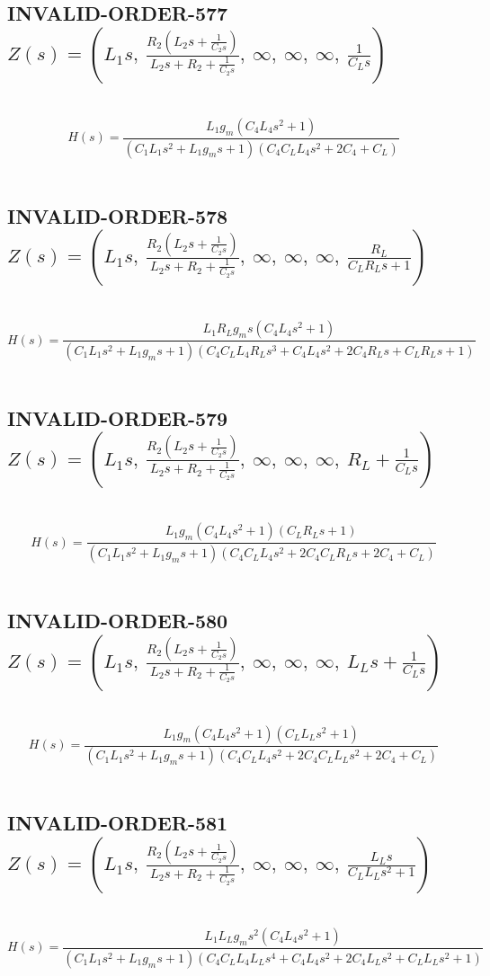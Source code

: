 \documentclass{article}
\begin{document}
\subsection{INVALID-ORDER-577 $Z(s) = \left( L_{1} s, \  \frac{R_{2} \left(L_{2} s + \frac{1}{C_{2} s}\right)}{L_{2} s + R_{2} + \frac{1}{C_{2} s}}, \  \infty, \  \infty, \  \infty, \  \frac{1}{C_{L} s}\right)$ } \ 
\textbf{\[H(s) = \frac{L_{1} g_{m} \left(C_{4} L_{4} s^{2} + 1\right)}{\left(C_{1} L_{1} s^{2} + L_{1} g_{m} s + 1\right) \left(C_{4} C_{L} L_{4} s^{2} + 2 C_{4} + C_{L}\right)}\] } \ 
\subsection{INVALID-ORDER-578 $Z(s) = \left( L_{1} s, \  \frac{R_{2} \left(L_{2} s + \frac{1}{C_{2} s}\right)}{L_{2} s + R_{2} + \frac{1}{C_{2} s}}, \  \infty, \  \infty, \  \infty, \  \frac{R_{L}}{C_{L} R_{L} s + 1}\right)$ } \ 
\textbf{\[H(s) = \frac{L_{1} R_{L} g_{m} s \left(C_{4} L_{4} s^{2} + 1\right)}{\left(C_{1} L_{1} s^{2} + L_{1} g_{m} s + 1\right) \left(C_{4} C_{L} L_{4} R_{L} s^{3} + C_{4} L_{4} s^{2} + 2 C_{4} R_{L} s + C_{L} R_{L} s + 1\right)}\] } \ 
\subsection{INVALID-ORDER-579 $Z(s) = \left( L_{1} s, \  \frac{R_{2} \left(L_{2} s + \frac{1}{C_{2} s}\right)}{L_{2} s + R_{2} + \frac{1}{C_{2} s}}, \  \infty, \  \infty, \  \infty, \  R_{L} + \frac{1}{C_{L} s}\right)$ } \ 
\textbf{\[H(s) = \frac{L_{1} g_{m} \left(C_{4} L_{4} s^{2} + 1\right) \left(C_{L} R_{L} s + 1\right)}{\left(C_{1} L_{1} s^{2} + L_{1} g_{m} s + 1\right) \left(C_{4} C_{L} L_{4} s^{2} + 2 C_{4} C_{L} R_{L} s + 2 C_{4} + C_{L}\right)}\] } \ 
\subsection{INVALID-ORDER-580 $Z(s) = \left( L_{1} s, \  \frac{R_{2} \left(L_{2} s + \frac{1}{C_{2} s}\right)}{L_{2} s + R_{2} + \frac{1}{C_{2} s}}, \  \infty, \  \infty, \  \infty, \  L_{L} s + \frac{1}{C_{L} s}\right)$ } \ 
\textbf{\[H(s) = \frac{L_{1} g_{m} \left(C_{4} L_{4} s^{2} + 1\right) \left(C_{L} L_{L} s^{2} + 1\right)}{\left(C_{1} L_{1} s^{2} + L_{1} g_{m} s + 1\right) \left(C_{4} C_{L} L_{4} s^{2} + 2 C_{4} C_{L} L_{L} s^{2} + 2 C_{4} + C_{L}\right)}\] } \ 
\subsection{INVALID-ORDER-581 $Z(s) = \left( L_{1} s, \  \frac{R_{2} \left(L_{2} s + \frac{1}{C_{2} s}\right)}{L_{2} s + R_{2} + \frac{1}{C_{2} s}}, \  \infty, \  \infty, \  \infty, \  \frac{L_{L} s}{C_{L} L_{L} s^{2} + 1}\right)$ } \ 
\textbf{\[H(s) = \frac{L_{1} L_{L} g_{m} s^{2} \left(C_{4} L_{4} s^{2} + 1\right)}{\left(C_{1} L_{1} s^{2} + L_{1} g_{m} s + 1\right) \left(C_{4} C_{L} L_{4} L_{L} s^{4} + C_{4} L_{4} s^{2} + 2 C_{4} L_{L} s^{2} + C_{L} L_{L} s^{2} + 1\right)}\] } \ 
\end{document}
